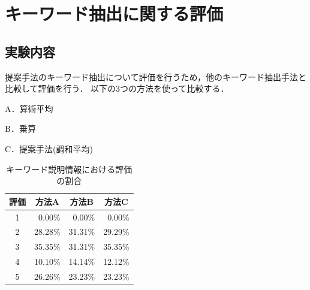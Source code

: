 \documentclass[submit]{ipsj}
\begin{document}
%
%



\section{キーワード抽出に関する評価}
\label{sec:キーワード抽出評価}
\subsection{実験内容}
提案手法のキーワード抽出について評価を行うため，他のキーワード抽出手法と比較して評価を行う．
以下の3つの方法を使って比較する．
\begin{description}
  \item A．算術平均
  \item B．乗算
  \item C．提案手法(調和平均)
\end{description}

\begin{table}[t]
  \caption{キーワード説明情報における評価の割合}
  \label{table:キーワード説明情報における評価の割合}
  \centering
  \begin{tabular}{c|r|r|r}
  \hline
  評価 & \multicolumn{1}{c|}{方法A} & \multicolumn{1}{c|}{方法B} & \multicolumn{1}{c}{方法C} \\ \hline
  1  & 0.00\%                   & 0.00\%                   & 0.00\%                  \\
  2  & 28.28\%                  & 31.31\%                  & 29.29\%                 \\
  3  & 35.35\%                  & 31.31\%                  & 35.35\%                 \\
  4  & 10.10\%                   & 14.14\%                  & 12.12\%                 \\
  5  & 26.26\%                  & 23.23\%                  & 23.23\%                 \\ \hline
  \end{tabular}
\end{table}
\end{document}
